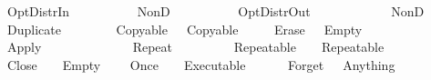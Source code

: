 \ \ {\isacharbar}\ {\isachardoublequoteopen}\ {\isacharparenleft}OptDistrIn\ \ \ \ {\isacharequal}\isanewline
\ \ \ \ \ \ NonD\ {\isacharparenleft}\ {\isasymodot}\ \ {\isacharparenleft}\ {\isasymodot}\ \isanewline
\ \ {\isacharbar}\ {\isachardoublequoteopen}\ {\isacharparenleft}OptDistrOut\ \ \ \ {\isacharequal}\isanewline
\ \ \ \ \ \ \ {\isasymodot}\ {\isacharparenleft}NonD\ \ \isanewline
\ \ {\isacharbar}\ {\isachardoublequoteopen}\ {\isacharparenleft}Duplicate\ \ {\isacharequal}\isanewline
\ \ \ \ \ \ Copyable\ \ {\isasymodot}\ Copyable\ \isanewline
\ \ {\isacharbar}\ {\isachardoublequoteopen}\ {\isacharparenleft}Erase\ \ {\isacharequal}\ Empty{\isachardoublequoteclose}\isanewline
\ \ {\isacharbar}\ {\isachardoublequoteopen}\ {\isacharparenleft}Apply\ \ \ {\isacharequal}\isanewline
\ \ \ \ \ \ \isanewline
\ \ {\isacharbar}\ {\isachardoublequoteopen}\ {\isacharparenleft}Repeat\ \ \ {\isacharequal}\isanewline
\ \ \ \ \ \ Repeatable\ \ \ \isasymodot\ Repeatable\ \ \isanewline
\ \ {\isacharbar}\ {\isachardoublequoteopen}\ {\isacharparenleft}Close\ \ \ {\isacharequal}\ Empty{\isachardoublequoteclose}\isanewline
\ \ {\isacharbar}\ {\isachardoublequoteopen}\ {\isacharparenleft}Once\ \ \ {\isacharequal}\ Executable\ \ \isanewline
\ \ {\isacharbar}\ {\isachardoublequoteopen}\ {\isacharparenleft}Forget\ \ {\isacharequal}\ Anything{\isachardoublequoteclose}

